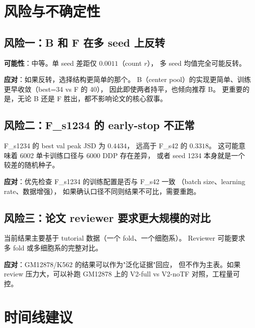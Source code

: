 \documentclass[11pt,a4paper]{ctexart}
\begin{document}
\section{风险与不确定性}
\label{sec:risk}

\subsection{风险一：B 和 F 在多 seed 上反转}

\textbf{可能性}：中等。单 seed 差距仅 $0.0011$（count $r$），
多 seed 均值完全可能反转。

\textbf{应对}：如果反转，选择结构更简单的那个。
B（center pool）的实现更简单、训练更早收敛（best=34 vs F 的 40），
因此即使两者持平，也倾向推荐 B。
更重要的是，无论 B 还是 F 胜出，都不影响论文的核心叙事。

\subsection{风险二：F\_s1234 的 early-stop 不正常}

F\_s1234 的 best val peak JSD 为 $0.4434$，
远高于 F\_s42 的 $0.3318$。
这可能意味着 6002 单卡训练口径与 6000 DDP 存在差异，
或者 seed 1234 本身就是一个较差的随机种子。

\textbf{应对}：优先检查 F\_s1234 的训练配置是否与 F\_s42 一致
（batch size、learning rate、数据增强），
如果确认口径不同则结果不可比，需要重跑。

\subsection{风险三：论文 reviewer 要求更大规模的对比}

当前结果主要基于 tutorial 数据（一个 fold、一个细胞系）。
Reviewer 可能要求多 fold 或多细胞系的完整对比。

\textbf{应对}：GM12878/K562 的结果可以作为"泛化证据"回应，
但不作为主表。如果 review 压力大，可以补跑 GM12878 上的
V2-full vs V2-noTF 对照，工程量可控。

\section{时间线建议}
\label{sec:timeline}
\end{document}
